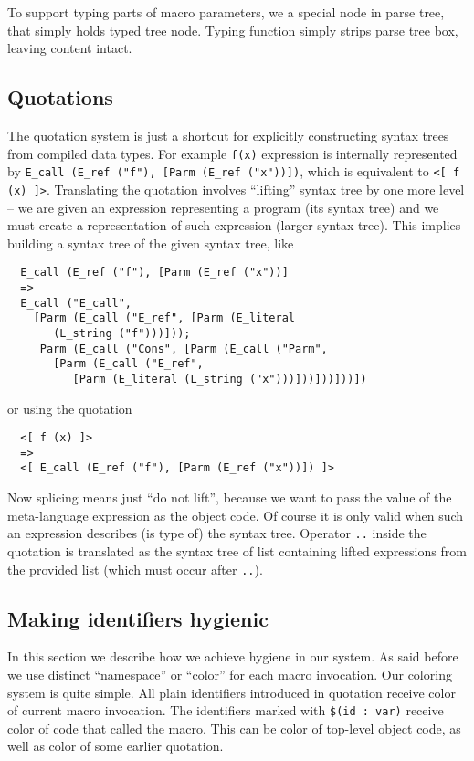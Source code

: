 \documentclass{llncs}
\begin{document}
To support typing parts of macro parameters, we a special node in parse
tree, that simply holds typed tree node. Typing function simply strips
parse tree box, leaving content intact.


\subsection{Quotations}
The quotation system is just a shortcut for explicitly constructing syntax
trees from compiled data types.  For example \verb,f(x),
expression is internally represented by 
\verb.E_call (E_ref ("f"), [Parm (E_ref ("x"))]).,
which is equivalent to \verb,<[ f (x) ]>,. Translating the quotation involves
``lifting'' syntax tree by one more level -- we are given an expression 
representing a program (its syntax tree) and we must create a representation 
of such expression (larger syntax tree).
This implies building a syntax tree of the given syntax tree, like

\begin{verbatim}
  E_call (E_ref ("f"), [Parm (E_ref ("x"))] 
  =>
  E_call ("E_call", 
    [Parm (E_call ("E_ref", [Parm (E_literal 
       (L_string ("f")))]));
     Parm (E_call ("Cons", [Parm (E_call ("Parm", 
       [Parm (E_call ("E_ref", 
          [Parm (E_literal (L_string ("x")))]))]))]))])
\end{verbatim}

\noindent
or using the quotation

\begin{verbatim}
  <[ f (x) ]> 
  =>
  <[ E_call (E_ref ("f"), [Parm (E_ref ("x"))]) ]>
\end{verbatim}

Now splicing means just ``do not lift'', because we want to pass the value of 
the meta-language expression as the object code. Of course it is only valid 
when such an expression describes (is type of) the syntax tree. Operator \verb,.., 
inside the quotation is translated as the syntax tree of list containing lifted 
expressions from the provided list (which must occur after \verb,..,).

\subsection{Making identifiers hygienic}
In this section we describe how we achieve hygiene in our system.
As said before we use distinct ``namespace'' or ``color'' for each macro
invocation. Our coloring system is quite simple.  All plain identifiers
introduced in quotation receive color of current macro invocation. The
identifiers marked with \verb,$(id : var), receive color of code that %
called the macro. This can be color of top-level object code, as well
as color of some earlier quotation.
\end{document}
